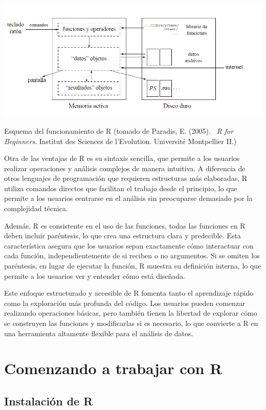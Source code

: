 \documentclass[
  letterpaper,
]{scrbook}
\begin{document}
\includegraphics{Prácticas_2025_26/Práctica_1/images/clipboard-988688670.png}

Esquema del funcionamiento de R (tomado de Paradis, E. (2005).~ \emph{R
for Beginners}. Institut des Sciences de l'Evolution. Université
Montpellier II.)

Otra de las ventajas de R es su sintaxis sencilla, que permite a los
usuarios realizar operaciones y análisis complejos de manera intuitiva.
A diferencia de otros lenguajes de programación que requieren
estructuras más elaboradas, R utiliza comandos directos que facilitan el
trabajo desde el principio, lo que permite a los usuarios centrarse en
el análisis sin preocuparse demasiado por la complejidad técnica.

Además, R es consistente en el uso de las funciones, todas las funciones
en R deben incluir paréntesis, lo que crea una estructura clara y
predecible. Esta característica asegura que los usuarios sepan
exactamente cómo interactuar con cada función, independientemente de si
reciben o no argumentos. Si se omiten los paréntesis, en lugar de
ejecutar la función, R muestra su definición interna, lo que permite a
los usuarios ver y entender cómo está diseñada.

Este enfoque estructurado y accesible de R fomenta tanto el aprendizaje
rápido como la exploración más profunda del código. Los usuarios pueden
comenzar realizando operaciones básicas, pero también tienen la libertad
de explorar cómo se construyen las funciones y modificarlas si es
necesario, lo que convierte a R en una herramienta altamente flexible
para el análisis de datos.

\hypertarget{comenzando-a-trabajar-con-r}{%
\chapter{Comenzando a trabajar con
R}\label{comenzando-a-trabajar-con-r}}

\hypertarget{instalaciuxf3n-de-r}{%
\section{Instalación de R}\label{instalaciuxf3n-de-r}}
\end{document}
